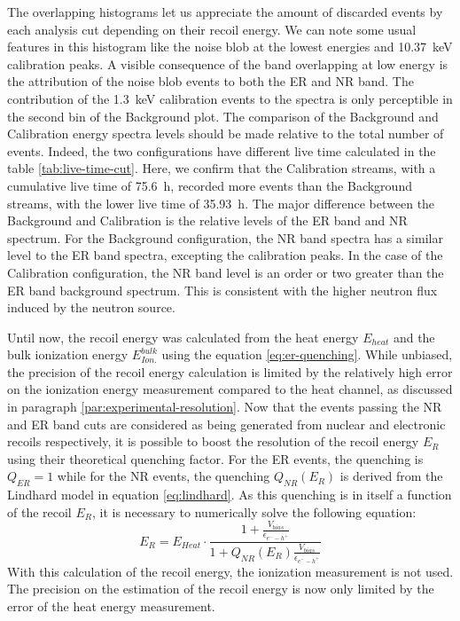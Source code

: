 The overlapping histograms let us appreciate the amount of discarded events by each analysis cut depending on their recoil energy. We can note some usual features in this histogram like the noise blob at the lowest energies and \SI{10.37}{\kilo\eV} calibration peaks. A visible consequence of the band overlapping at low energy is the attribution of the noise blob events to both the ER and NR band. The contribution of the \SI{1.3}{\kilo\eV} calibration events to the spectra is only perceptible in the second bin of the Background plot.
The comparison of the Background and Calibration energy spectra levels should be made relative to the total number of events. Indeed, the two configurations have different live time calculated in the table \ref{tab:live-time-cut}. Here, we confirm that the Calibration streams, with a cumulative live time of \SI{75.6}{\hour}, recorded more events than the Background streams, with the lower live time of \SI{35.93}{\hour}.
The major difference between the Background and Calibration is the relative levels of the ER band and NR spectrum. For the Background configuration, the NR band spectra has a similar level to the ER band spectra, excepting the calibration peaks. In the case of the Calibration configuration, the NR band level is an order or two greater than the ER band background spectrum. This is consistent with the higher neutron flux induced by the neutron source.

Until now, the recoil energy was calculated from the heat energy $E_{heat}$ and the bulk ionization energy $E_{Ion.}^{bulk}$ using the equation \ref{eq:er-quenching}. While unbiased, the precision of the recoil energy calculation is limited by the relatively high error on the ionization energy measurement compared to the heat channel, as discussed in paragraph \ref{par:experimental-resolution}. Now that the events passing the NR and ER band cuts are considered as being generated from nuclear and electronic recoils respectively, it is possible to boost the resolution of the recoil energy $E_R$ using their theoretical quenching factor. For the ER events, the quenching is $Q_{ER}=1$ while for the NR events, the quenching $Q_{NR} (E_R)$ is derived from the Lindhard model in equation \ref{eq:lindhard}. As this quenching is in itself a function of the recoil $E_R$, it is necessary to numerically solve the following equation:
\begin{equation}
\label{eq:er-from-heat}
E_R 
=
E_{Heat} 
\cdot
\frac{
1 + \frac{V_{bias}}{\epsilon_{e^--h^+}}
}{
1 + Q_{NR} \left( E_R \right)\frac{V_{bias}}{\epsilon_{e^--h^+}}
}
\end{equation}
With this calculation of the recoil energy, the ionization measurement is not used. The precision on the estimation of the recoil energy is now only limited by the error of the heat energy measurement.

